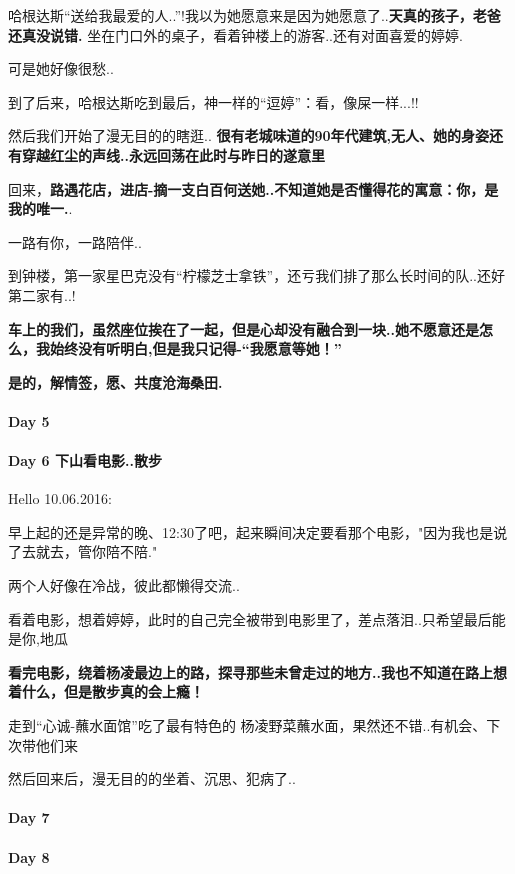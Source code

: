 \documentclass[UTF8,a4paper,8pt]{ctexbook}
\begin{document}
	 	 哈根达斯“送给我最爱的人..”!我以为她愿意来是因为她愿意了..\textbf{天真的孩子，老爸还真没说错.}
	 	 坐在门口外的桌子，看着钟楼上的游客..还有对面喜爱的婷婷.
	 	 
	 	 可是她好像很愁..
	 	 
	 	 到了后来，哈根达斯吃到最后，神一样的“逗婷”：看，像屎一样...!!
	 	 
	 	 然后我们开始了漫无目的的瞎逛.. \textbf{很有老城味道的90年代建筑,无人、她的身姿还有穿越红尘的声线..永远回荡在此时与昨日的遂意里}
	 	 
	 	 回来，\textbf{路遇花店，进店-摘一支白百何送她..不知道她是否懂得花的寓意：你，是我的唯一.}.
	 	 
	 	 一路有你，一路陪伴..
	 	 
	 	 到钟楼，第一家星巴克没有“柠檬芝士拿铁”，还亏我们排了那么长时间的队..还好第二家有..!
	 	 
	 	 \textbf{车上的我们，虽然座位挨在了一起，但是心却没有融合到一块..她不愿意还是怎么，我始终没有听明白,但是我只记得-“我愿意等她！”}
	 	 
	 	 \textbf{是的，解情签，愿、共度沧海桑田.}
	 	 
	 	 
 	 \paragraph{Day 5       \quad     }
 	 \paragraph{Day 6   下山看电影..散步    \quad     }
	 	 Hello 10.06.2016:
	 	 
	 	 早上起的还是异常的晚、12:30了吧，起来瞬间决定要看那个电影，"因为我也是说了去就去，管你陪不陪."
	 	 
	 	 两个人好像在冷战，彼此都懒得交流..
	 	 
	 	 看着电影，想着婷婷，此时的自己完全被带到电影里了，差点落泪..只希望最后能是你,地瓜
	 	 
	 	 \textbf{看完电影，绕着杨凌最边上的路，探寻那些未曾走过的地方..我也不知道在路上想着什么，但是散步真的会上瘾！}
	 	 
	 	 走到“心诚-蘸水面馆”吃了最有特色的 杨凌野菜蘸水面，果然还不错..有机会、下次带他们来
	 	 
	 	 然后回来后，漫无目的的坐着、沉思、犯病了..
 	 \paragraph{Day 7       \quad     }
 	 \paragraph{Day 8       \quad     }
\end{document}
